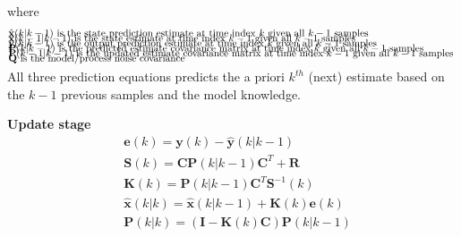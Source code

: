 where 
\begin{align*}
	&\text{$\hat{\textbf{x}}(k|k-1)$ is the state prediction estimate at time index $k$ given all $ k-1 $ samples		}	\\[-1em]
	&\text{$\hat{\textbf{x}}(k-1|k-1)$ is the state estimate at time index $k-1$ given all $ k-1 $ samples				}	\\[-1em]
	&\text{$\hat{\textbf{y}}(k|k-1)$ is the output prediction estimate at time index $k$ given all $ k-1 $ samples		}	\\[-1em]
	&\text{$\textbf{P}(k|k-1)$ is the predicted estimate covariance matrix at time index $k$ given all $ k-1 $ samples			}	\\[-1em]
	&\text{$\textbf{P}(k-1|k-1)$ is the updated estimate covariance matrix at time index $k-1$ given all $ k-1 $ samples		}	\\[-1em]
	&\text{$\textbf{Q}$	is the model/process noise covariance}	\\[-1em]
\end{align*}

All three prediction equations predicts the a priori $ k^{th}$ (next) estimate based on the $k-1$ previous samples and the model knowledge.

\textbf{Update stage}
\begin{align}
	&\textbf{e}(k) = \textbf{y}(k) - \hat{\textbf{y}}(k|k-1)						\\
	&\textbf{S}(k) = \textbf{C}\textbf{P}(k|k-1)\textbf{C}^T + \textbf{R}			\\
	&\textbf{K}(k) = \textbf{P}(k|k-1)\textbf{C}^T\textbf{S}^{-1}(k)				\\
	&\hat{\textbf{x}}(k|k) = \hat{\textbf{x}}(k|k-1) + \textbf{K}(k)\textbf{e}(k) 	\\
	&\textbf{P}(k|k) = (\textbf{I} - \textbf{K}(k)\textbf{C})\textbf{P}(k|k-1)		
\end{align}

